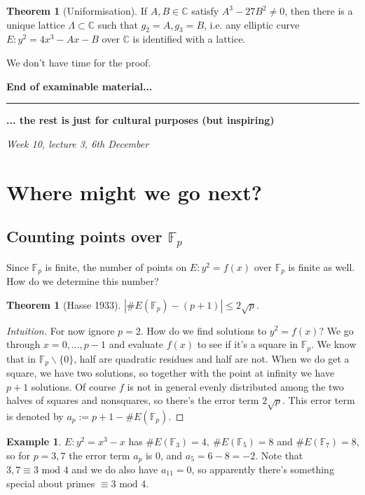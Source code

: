 \documentclass{article}
\newcommand{\F}{\mathbb{F}}
\newcommand{\C}{\mathbb{C}}
\newcommand{\Mod}{\text{ mod }}
\theoremstyle{definition}
\newtheorem{thm}[defn]{Theorem}
\newtheorem{example}[defn]{Example}
\begin{document}
\begin{thm}[Uniformisation]
If $A,B\in\C$ satisfy $A^3-27B^2\neq 0$, then there is a unique lattice $\Lambda\subset\C$ such that $g_2=A,g_3=B$, i.e. any elliptic curve $E:y^2=4x^3-Ax-B$ over $\C$ is identified with a lattice.
\end{thm}
We don't have time for the proof.

\begin{center}
\textbf{End of examinable material...}

\hspace{0.1mm}

\hrule

\hspace{0.1mm}

\textbf{... the rest is just for cultural purposes (but inspiring)}
\end{center}

\begin{flushright}
\textit{Week 10, lecture 3, 6th December}
\end{flushright}

\section{Where might we go next?}
\subsection{Counting points over $\F_p$}
Since $\F_p$ is finite, the number of points on $E:y^2=f(x)$ over $\F_p$ is finite as well. How do we determine this number?

\begin{thm}[Hasse 1933]
\label{thm:hasse1933}
$|\# E(\F_p)-(p+1)|\leq 2\sqrt p$.
\end{thm}
\begin{proof}[Intuition]
For now ignore $p=2$. How do we find solutions to $y^2=f(x)$? We go through $x=0,\ldots,p-1$ and evaluate $f(x)$ to see if it's a square in $\F_p$. We know that in $\F_p\backslash\{0\}$, half are quadratic residues and half are not. When we do get a square, we have two solutions, so together with the point at infinity we have $p+1$ solutions. Of course $f$ is not in general evenly distributed among the two halves of squares and nonsquares, so there's the error term $2\sqrt p$. This error term is denoted by $a_p:=p+1-\# E(\F_p)$.
\end{proof}

\begin{example}
$E:y^2=x^3-x$ has $\# E(\F_3)=4,\ \# E(\F_5)=8$ and $\# E(\F_7)=8$, so for $p=3,7$ the error term $a_p$ is 0, and $a_5=6-8=-2$. Note that $3,7\equiv 3\Mod 4$ and we do also have $a_{11}=0$, so apparently there's something special about primes $\equiv 3\Mod 4$.
\end{example}
\end{document}
